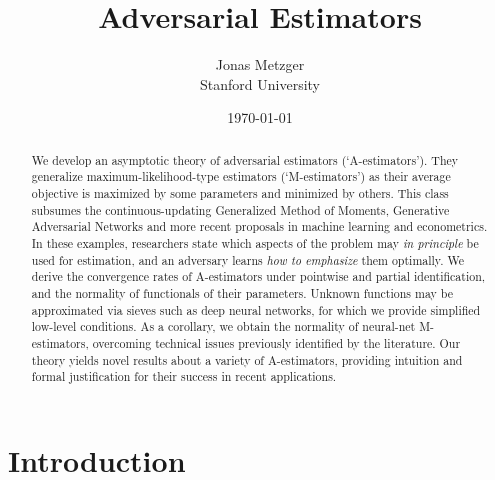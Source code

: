 \documentclass[12pt]{article}
\title{\vspace{-1.7cm}Adversarial Estimators}
\author{Jonas Metzger \\ Stanford University}
\date{\AdvanceDate[-1]\today}
\theoremstyle{myplain}
\theoremstyle{definition}
\theoremstyle{definition}
\theoremstyle{remark}
\numberwithin{equation}{section}
\begin{document}
\maketitle


\begin{abstract}
We develop an asymptotic theory of adversarial estimators (`A-estimators'). They generalize maximum-likelihood-type estimators (`M-estimators') as their average objective is maximized by some parameters and minimized by others. This class subsumes the continuous-updating Generalized Method of Moments, Generative Adversarial Networks and more recent proposals in machine learning and econometrics. In these examples, researchers state which aspects of the problem may {\it in principle} be used for estimation, and an adversary learns {\it how to emphasize} them optimally. We derive the convergence rates of A-estimators under pointwise and partial identification, and the normality of functionals of their parameters. Unknown functions may be approximated via sieves such as deep neural networks, for which we provide simplified low-level conditions. As a corollary, we obtain the normality of neural-net M-estimators, overcoming technical issues previously identified by the literature. Our theory yields novel results about a variety of A-estimators, providing intuition and formal justification for their success in recent applications.
\end{abstract}

\onehalfspacing
\section{Introduction}
\end{document}

